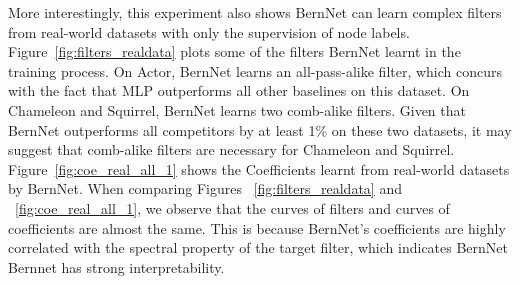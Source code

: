 \documentclass{article}
\begin{document}
\begin{table}[t]
\centering
\small
\caption{Results on real world benchmark datasets: Mean accuracy (\%) ± 95\% confidence interval.}
\label{acc_res}
\end{table}


More interestingly, this experiment also shows BernNet can learn complex filters from real-world datasets with only the supervision of node labels.  Figure~\ref{fig:filters_realdata} plots some of the filters BernNet learnt in the training process. On Actor, BernNet learns an all-pass-alike filter, which concurs with the fact that MLP outperforms all other baselines on this dataset. On Chameleon and Squirrel, BernNet learns two comb-alike filters. Given that BernNet outperforms all competitors by at least 1\% on these two datasets, it may suggest that comb-alike filters are necessary for Chameleon and Squirrel. Figure~\ref{fig:coe_real_all_1} shows the Coefficients  learnt from real-world datasets by BernNet. When comparing Figures ~\ref{fig:filters_realdata} and ~\ref{fig:coe_real_all_1}, we observe that the curves of filters and curves of coefficients are almost the same. This is because BernNet's coefficients are highly correlated with the spectral property of the target filter, which indicates BernNet Bernnet has strong interpretability.
\end{document}
